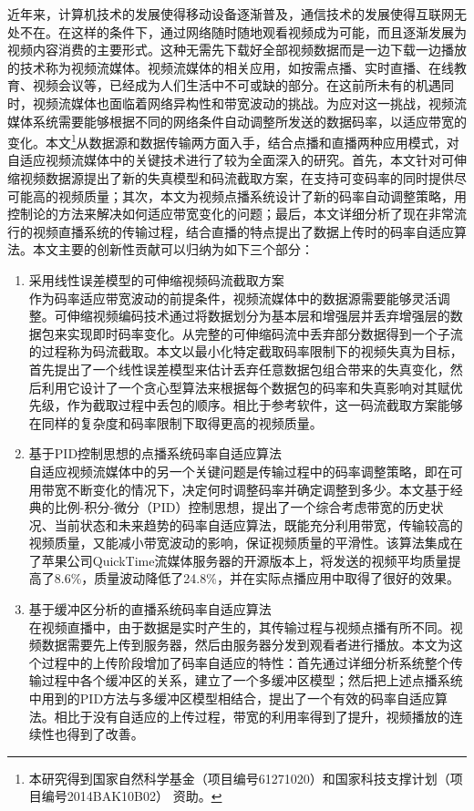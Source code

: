 \begin{cabstract}
\begin{spacing}{1.5}
近年来，计算机技术的发展使得移动设备逐渐普及，通信技术的发展使得互联网无处不在。在这样的条件下，通过网络随时随地观看视频成为可能，而且逐渐发展为视频内容消费的主要形式。这种无需先下载好全部视频数据而是一边下载一边播放的技术称为视频流媒体。视频流媒体的相关应用，如按需点播、实时直播、在线教育、视频会议等，已经成为人们生活中不可或缺的部分。在这前所未有的机遇同时，视频流媒体也面临着网络异构性和带宽波动的挑战。为应对这一挑战，视频流媒体系统需要能够根据不同的网络条件自动调整所发送的数据码率，以适应带宽的变化。本文\footnote{本研究得到国家自然科学基金（项目编号61271020）和国家科技支撑计划（项目编号2014BAK10B02） 资助。}从数据源和数据传输两方面入手，结合点播和直播两种应用模式，对自适应视频流媒体中的关键技术进行了较为全面深入的研究。首先，本文针对可伸缩视频数据源提出了新的失真模型和码流截取方案，在支持可变码率的同时提供尽可能高的视频质量；其次，本文为视频点播系统设计了新的码率自动调整策略，用控制论的方法来解决如何适应带宽变化的问题；最后，本文详细分析了现在非常流行的视频直播系统的传输过程，结合直播的特点提出了数据上传时的码率自适应算法。本文主要的创新性贡献可以归纳为如下三个部分：
\begin{enumerate}
\item {采用线性误差模型的可伸缩视频码流截取方案}\\
作为码率适应带宽波动的前提条件，视频流媒体中的数据源需要能够灵活调整。可伸缩视频编码技术通过将数据划分为基本层和增强层并丢弃增强层的数据包来实现即时码率变化。从完整的可伸缩码流中丢弃部分数据得到一个子流的过程称为码流截取。本文以最小化特定截取码率限制下的视频失真为目标，首先提出了一个线性误差模型来估计丢弃任意数据包组合带来的失真变化，然后利用它设计了一个贪心型算法来根据每个数据包的码率和失真影响对其赋优先级，作为截取过程中丢包的顺序。相比于参考软件，这一码流截取方案能够在同样的复杂度和码率限制下取得更高的视频质量。
\item {基于PID控制思想的点播系统码率自适应算法}\\
自适应视频流媒体中的另一个关键问题是传输过程中的码率调整策略，即在可用带宽不断变化的情况下，决定何时调整码率并确定调整到多少。本文基于经典的比例-积分-微分（PID）控制思想，提出了一个综合考虑带宽的历史状况、当前状态和未来趋势的码率自适应算法，既能充分利用带宽，传输较高的视频质量，又能减小带宽波动的影响，保证视频质量的平滑性。该算法集成在了苹果公司QuickTime流媒体服务器的开源版本上，将发送的视频平均质量提高了8.6\%，质量波动降低了24.8\%，并在实际点播应用中取得了很好的效果。
\item {基于缓冲区分析的直播系统码率自适应算法}\\
在视频直播中，由于数据是实时产生的，其传输过程与视频点播有所不同。视频数据需要先上传到服务器，然后由服务器分发到观看者进行播放。本文为这个过程中的上传阶段增加了码率自适应的特性：首先通过详细分析系统整个传输过程中各个缓冲区的关系，建立了一个多缓冲区模型；然后把上述点播系统中用到的PID方法与多缓冲区模型相结合，提出了一个有效的码率自适应算法。相比于没有自适应的上传过程，带宽的利用率得到了提升，视频播放的连续性也得到了改善。
\end{enumerate}
\end{spacing}
\end{cabstract}

